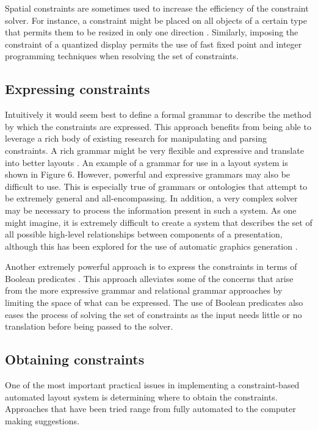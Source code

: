 		Spatial constraints are sometimes used to increase the efficiency of the
		constraint solver. For instance, a constraint might be placed on all
		objects of a certain type that permits them to be resized in only one
		direction \citep{linton-1}. Similarly, imposing the constraint of a
		quantized display permits the use of fast fixed point and integer
		programming techniques when resolving the set of constraints.

    \subsection{Expressing constraints}

		Intuitively it would seem best to define a formal grammar to describe the
		method by which the constraints are expressed. This approach benefits from
		being able to leverage a rich body of existing research for manipulating
		and parsing constraints. A rich grammar might be very flexible and
		expressive and translate into better layouts \citep{weitzman-1}. An example
		of a grammar for use in a layout system is shown in Figure 6. However,
		powerful and expressive grammars may also be difficult to use. This is
		especially true of grammars or ontologies that attempt to be extremely
		general and all-encompassing. In addition, a very complex solver may be
		necessary to process the information present in such a system. As one might
		imagine, it is extremely difficult to create a system that describes the
		set of all possible high-level relationships between components of a
		presentation, although this has been explored for the use of automatic
		graphics generation \citep{zhou-1}.

		Another extremely powerful approach is to express the constraints in terms
		of Boolean predicates \citep{graf-1}. This approach alleviates some of the
		concerns that arise from the more expressive grammar and relational grammar
		approaches by limiting the space of what can be expressed. The use of
		Boolean predicates also eases the process of solving the set of constraints
		as the input needs little or no translation before being passed to the
		solver.

		\subsection{Obtaining constraints}

		One of the most important practical issues in implementing a
		constraint-based automated layout system is determining where to obtain the
		constraints. Approaches that have been tried range from fully automated to
		the computer making suggestions.


